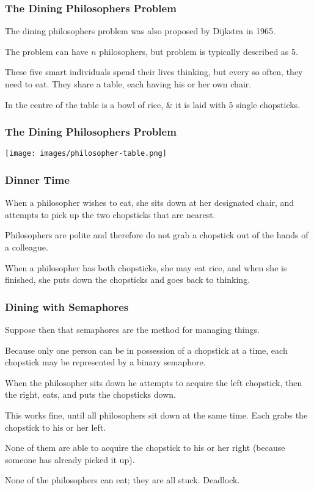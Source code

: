 \begin{frame}
	\frametitle{The Dining Philosophers Problem}

	The dining philosophers problem was also proposed by Dijkstra in 1965.

	The problem can have $n$ philosophers, but problem is typically described as 5.

	These five smart individuals spend their lives thinking, but every so often, they need to eat. They share a table, each having his or her own chair.

	In the centre of the table is a bowl of rice, \& it is laid with 5 single chopsticks.

\end{frame}

\begin{frame}
	\frametitle{The Dining Philosophers Problem}

	\begin{center}
		\texttt{[image: images/philosopher-table.png]}
	\end{center}

\end{frame}

\begin{frame}
	\frametitle{Dinner Time}

	When a philosopher wishes to eat, she sits down at her designated chair, and attempts to pick up the two chopsticks that are nearest.

	Philosophers are polite and therefore do not grab a chopstick out of the hands of a colleague.

	When a philosopher has both chopsticks, she may eat rice, and when she is finished, she puts down the chopsticks and goes back to thinking.


\end{frame}

\begin{frame}
	\frametitle{Dining with Semaphores}

	Suppose then that semaphores are the method for managing things.

	Because only one person can be in possession of a chopstick at a time, each chopstick may be represented by a binary semaphore.

	When the philosopher sits down he attempts to acquire the left chopstick, then the right, eats, and puts the chopsticks down.

	This works fine, until all philosophers sit down at the same time. Each grabs the chopstick to his or her left.

	None of them are able to acquire the chopstick to his or her right (because someone has already picked it up).

	None of the philosophers can eat; they are all stuck. Deadlock.

\end{frame}

